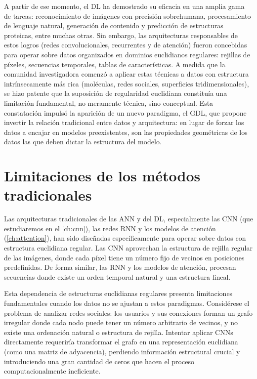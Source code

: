 A partir de ese momento, el \gls{DL} ha demostrado su eficacia en una amplia gama de tareas: reconocimiento de imágenes con precisión sobrehumana, procesamiento de lenguaje natural, generación de contenido y predicción de estructuras proteicas, entre muchas otras. Sin embargo, las arquitecturas responsables de estos logros (redes convolucionales, recurrentes y de atención) fueron concebidas para operar sobre datos organizados en dominios euclidianos regulares: rejillas de píxeles, secuencias temporales, tablas de características. A medida que la comunidad investigadora comenzó a aplicar estas técnicas a datos con estructura intrínsecamente más rica (moléculas, redes sociales, superficies tridimensionales), se hizo patente que la suposición de regularidad euclidiana constituía una limitación fundamental, no meramente técnica, sino conceptual. Esta constatación impulsó la aparición de un nuevo paradigma, el \gls{GDL}, que propone invertir la relación tradicional entre datos y arquitectura: en lugar de forzar los datos a encajar en modelos preexistentes, son las propiedades geométricas de los datos las que deben dictar la estructura del modelo.

\section{Limitaciones de los métodos tradicionales}\label{sec:limitaciones_tradicionales}

Las arquitecturas tradicionales de las \gls{ANN} y del \gls{DL}, especialmente las \gls{CNN} (que estudiaremos en el \autoref{ch:cnn}), las redes \gls{RNN} y los modelos de atención (\autoref{ch:attention}), han sido diseñadas específicamente para operar sobre datos con estructura euclidiana regular. Las \gls{CNN} aprovechan la estructura de rejilla regular de las imágenes, donde cada píxel tiene un número fijo de vecinos en posiciones predefinidas. De forma similar, las \gls{RNN} y los modelos de atención, procesan secuencias donde existe un orden temporal natural y una estructura lineal.

Esta dependencia de estructuras euclidianas regulares presenta limitaciones fundamentales cuando los datos no se ajustan a estos paradigmas. Considérese el problema de analizar redes sociales: los usuarios y sus conexiones forman un grafo irregular donde cada nodo puede tener un número arbitrario de vecinos, y no existe una ordenación natural o estructura de rejilla. Intentar aplicar \glspl{CNN} directamente requeriría transformar el grafo en una representación euclidiana (como una matriz de adyacencia), perdiendo información estructural crucial y introduciendo una gran cantidad de ceros que hacen el proceso computacionalmente ineficiente.

